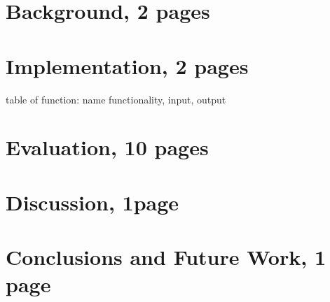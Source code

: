 \documentclass{llncs}
\begin{document}
\section{Background, 2 pages}


\section{Implementation, 2 pages}
table of function: name functionality, input, output
\pagebreak
\section{Evaluation, 10 pages}




\section{Discussion, 1page}


\section{Conclusions and Future Work, 1 page}




%
%
%
%
%
%
%
\clearpage
%
\end{document}
